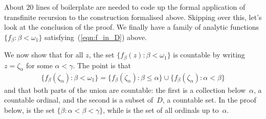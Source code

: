 \documentclass[runningheads]{llncs}
\begin{document}
About 20 lines of boilerplate are needed to code up the formal application of transfinite recursion to the construction formalised above. Skipping over this, let's look at the conclusion of the proof.
We finally have a family of analytic functions $\{f_\beta : \beta < \omega_1 \}$ satisfying~(\ref{eqn:f_in_D}) above. 

We now show that for all $z$, the set $\{f_\beta(z) : \beta < \omega_1 \}$ is countable by writing $z=\zeta_\alpha$ for some $\alpha<\gamma$.
The point is that 
\begin{align*}
\{f_\beta(\zeta_\alpha) : \beta < \omega_1 \} = \{f_\beta (\zeta_\alpha): \beta\le\alpha\} \cup \{f_\beta (\zeta_\alpha): \alpha<\beta\}
\end{align*}
and that both parts of the union are countable: the first is a collection below~$\alpha$, a countable ordinal, and the second is a subset of~$D$, a countable set.
In the proof below,  is the set $\{\beta: \alpha<\beta<\gamma\}$, while  is the set of all ordinals up to~$\alpha$. 
\end{document}
